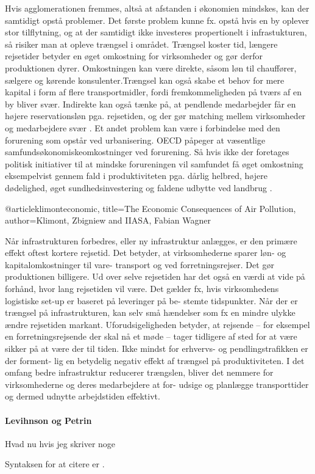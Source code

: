 Hvis agglomerationen fremmes, altså at afstanden i økonomien mindskes, kan der samtidigt opstå problemer. Det første problem kunne fx. opstå hvis en by oplever stor tilflytning, og at der samtidigt ikke investeres propertionelt i infrastukturen, så risiker man at opleve trængsel i området. Trængsel koster tid, længere rejsetider betyder en øget omkostning for virksomheder og gør derfor produktionen dyrer. Omkostningen kan være direkte, såsom løn til chauffører, sælgere og kørende konsulenter.Trængsel kan også skabe et behov for mere kapital i form af flere transportmidler, fordi fremkommeligheden på tværs af en by bliver svær. Indirekte kan også tænke på, at pendlende medarbejder får en højere reservationsløn pga. rejsetiden, og der gør matching mellem virksomheder og medarbejdere svær \cite{sorensen2014infrastruktur}. Et andet problem kan være i forbindelse med den forurening som opstår ved urbanisering. OECD påpeger at væsentlige samfundsøkonomiskeomkostninger ved forurening. Så hvis ikke der foretages politisk initiativer til at mindske forureningen vil samfundet få øget omkostning eksempelvist gennem fald i produktiviteten pga. dårlig helbred, højere dødelighed, øget sundhedsinvestering og faldene udbytte ved landbrug \cite{klimonteconomic}.




@article{klimonteconomic,
  title={The Economic Consequences of Air Pollution},
  author={Klimont, Zbigniew and IIASA, Fabian Wagner}
}

Når infrastrukturen forbedres, eller ny infrastruktur anlægges, er den primære effekt oftest kortere rejsetid. Det betyder, at virksomhederne sparer løn- og kapitalomkostninger til vare- transport og ved forretningsrejser. Det gør produktionen billigere.
Ud over selve rejsetiden har det også en værdi at vide på forhånd, hvor lang rejsetiden vil være. Det gælder fx, hvis virksomhedens logistiske set-up er baseret på leveringer på be- stemte tidspunkter. Når der er trængsel på infrastrukturen, kan selv små hændelser som fx en mindre ulykke ændre rejsetiden markant. Uforudsigeligheden betyder, at rejsende – for eksempel en forretningsrejsende der skal nå et møde – tager tidligere af sted for at være sikker på at være der til tiden. Ikke mindst for erhvervs- og pendlingstrafikken er der forment- lig en betydelig negativ effekt af trængsel på produktiviteten. I det omfang bedre infrastruktur reducerer trængslen, bliver det nemmere for virksomhederne og deres medarbejdere at for- udsige og planlægge transporttider og dermed udnytte arbejdstiden effektivt.

\paragraph{Levihnson og Petrin}
Hvad nu hvis jeg skriver noge

Syntaksen for at citere er \cite[pp. 211ff.]{melo2009meta}. 



